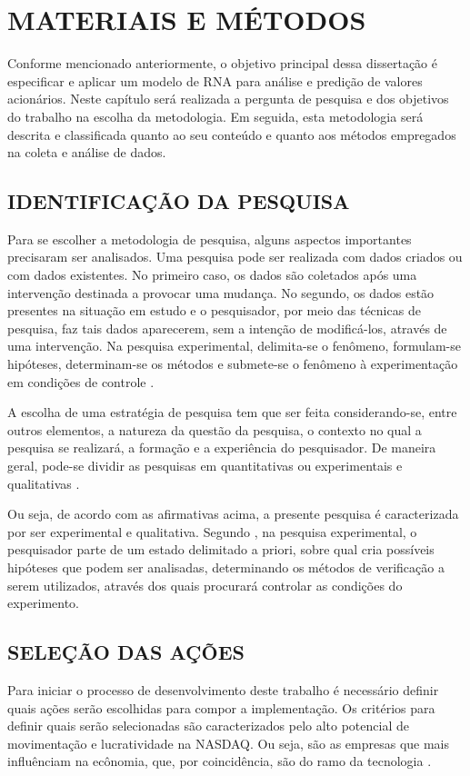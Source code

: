
\chapter{MATERIAIS E MÉTODOS}\label{ch:materiais-metodos}
Conforme mencionado anteriormente, o objetivo principal dessa dissertação é especificar e aplicar um modelo de RNA para análise e predição de valores acionários. Neste capítulo será realizada a pergunta de pesquisa e dos objetivos do trabalho na escolha da metodologia. Em seguida, esta metodologia será descrita e classificada quanto ao seu conteúdo e quanto aos métodos empregados na coleta e análise de dados.

\section{IDENTIFICAÇÃO DA PESQUISA}

Para se escolher a metodologia de pesquisa, alguns aspectos importantes precisaram ser analisados. Uma pesquisa pode ser realizada com dados criados ou com dados existentes. No primeiro caso, os dados são coletados após uma intervenção destinada a provocar uma mudança. No segundo, os dados estão presentes na situação em estudo e o pesquisador, por meio das técnicas de pesquisa, faz tais dados aparecerem, sem a intenção de modificá-los, através de uma intervenção. Na pesquisa experimental, delimita-se o fenômeno, formulam-se hipóteses, determinam-se os métodos e submete-se o fenômeno à experimentação em condições de controle \cite{laville}.

A escolha de uma estratégia de pesquisa tem que ser feita considerando-se, entre outros elementos, a natureza da questão da pesquisa, o contexto no qual a pesquisa se realizará, a formação e a experiência do pesquisador. De maneira geral, pode-se dividir as pesquisas em quantitativas ou experimentais e qualitativas \cite{laville}.

Ou seja, de acordo com as afirmativas acima, a presente pesquisa é caracterizada por ser experimental e qualitativa. Segundo , na pesquisa experimental, o pesquisador parte de um estado delimitado a priori, sobre qual cria possíveis hipóteses que podem ser analisadas, determinando os métodos de verificação a serem utilizados, através dos quais procurará controlar as condições do experimento.

\section{SELEÇÃO DAS AÇÕES}
Para iniciar o processo de desenvolvimento deste trabalho é necessário definir quais ações serão escolhidas para compor a implementação. Os critérios para definir quais serão selecionadas são caracterizados pelo alto potencial de movimentação e lucratividade na NASDAQ. Ou seja, são as empresas que mais influênciam na ecônomia, que, por coincidência, são do ramo da tecnologia \cite{christie}.

